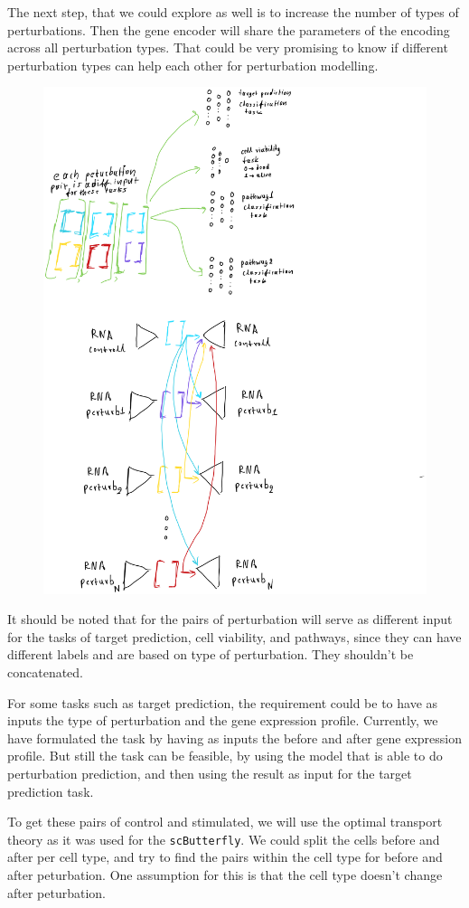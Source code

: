\documentclass[12pt, a4paper]{article}
\begin{document}
The next step, that we could explore as well is to increase the number of types of perturbations. Then the gene encoder will share the parameters of the encoding across all perturbation types. That could be very promising to know if different perturbation types can help each other for perturbation modelling.

\begin{figure}[h!]
  \centering
  \includegraphics[width=.8\textwidth]{my_multi_many_mod.PNG}
  \caption{}
  \label{}
\end{figure}

It should be noted that for the pairs of perturbation will serve as different input for the tasks of target prediction, cell viability, and pathways, since they can have different labels and are based on type of perturbation. They shouldn't be concatenated.

For some tasks such as target prediction, the requirement could be to have as inputs the type of perturbation and the gene expression profile. Currently, we have formulated the task by having as inputs the before and after gene expression profile. But still the task can be feasible, by using the model that is able to do perturbation prediction, and then using the result as input for the target prediction task. 

To get these pairs of control and stimulated, we will use the optimal transport theory as it was used for the \verb|scButterfly|. We could split the cells before and after per cell type, and try to find the pairs within the cell type for before and after peturbation. One assumption for this is that the cell type doesn't change after peturbation.



\clearpage



\end{document}
